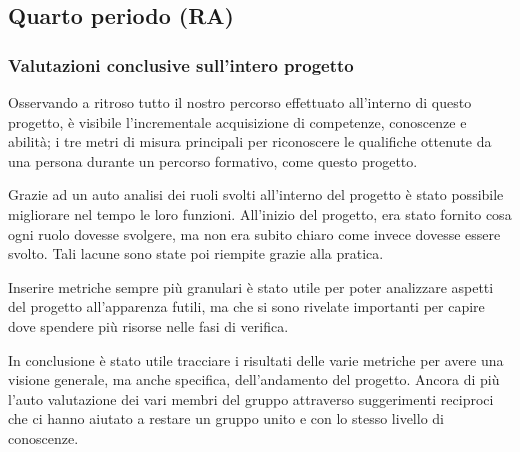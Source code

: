 	\subsection{Quarto periodo (RA)}\label{valutazioni per il miglioramento:RA}
	
	\subsubsection{Valutazioni conclusive sull'intero progetto}
	Osservando a ritroso tutto il nostro percorso effettuato all'interno di questo progetto, è visibile l'incrementale acquisizione di competenze, conoscenze e abilità; i tre metri di misura principali per riconoscere le qualifiche ottenute da una persona durante un percorso formativo, come questo progetto.\par
	Grazie ad un auto analisi dei ruoli svolti all'interno del progetto è stato possibile migliorare nel tempo le loro funzioni. All'inizio del progetto, era stato fornito cosa ogni ruolo dovesse svolgere, ma non era subito chiaro come invece dovesse essere svolto. Tali lacune sono state poi riempite grazie alla pratica. \par
	Inserire metriche sempre più granulari è stato utile per poter analizzare aspetti del progetto all'apparenza futili, ma che si sono rivelate importanti per capire dove spendere più risorse nelle fasi di verifica. \par
	In conclusione è stato utile tracciare i risultati delle varie metriche per avere una visione generale, ma anche specifica, dell'andamento del progetto. Ancora di più l'auto valutazione dei vari membri del gruppo attraverso suggerimenti reciproci che ci hanno aiutato a restare un gruppo unito e con lo stesso livello di conoscenze.






